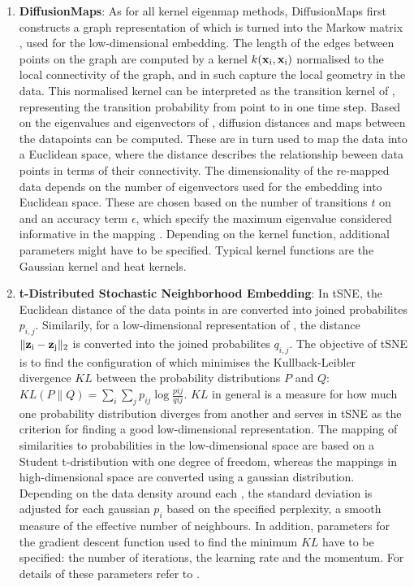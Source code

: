 \begin{enumerate}
\item\textbf{DiffusionMaps}: As for all kernel eigenmap methods, DiffusionMaps first constructs a graph representation of  which is turned into the Markow matrix , used for the low-dimensional embedding. The length of the edges between points on the graph are computed by a kernel \(k(\boldsymbol{\mathbf{x}}_\text{i},\boldsymbol{\mathbf{x}}_\text{i})\) normalised to the local connectivity of the graph, and in such capture the local geometry in the data. This normalised kernel can be interpreted as the transition kernel of , representing the transition probability from point  to  in one time step. Based on the eigenvalues and eigenvectors of , diffusion distances and maps between the datapoints can be computed. These are in turn used to map the data into a Euclidean space, where the distance describes the relationship beween data points in terms of their connectivity. The dimensionality of the re-mapped data depends on the number of eigenvectors used for the embedding into Euclidean space. These are chosen based on the number of transitions \(t\) on  and an accuracy term \(\epsilon\), which specify the maximum eigenvalue considered informative in the mapping \citep{Coifman2005,Coifman2006}. Depending on the kernel function, additional parameters might have to be specified. Typical kernel functions are the Gaussian kernel and  heat kernels.

\item\textbf{t-Distributed Stochastic Neighborhood Embedding}: In tSNE, the Euclidean distance of the data points in  are converted into joined probabilites \(p_{i,j}\). Similarily, for  a low-dimensional representation  of , the distance  \(\lVert \boldsymbol{\mathbf{z}}_\text{i} -\boldsymbol{\mathbf{z}}_\text{j}\rVert_2 \) is converted into the joined probabilites \(q_{i,j}\). The objective of tSNE is to find the configuration of  which minimises the Kullback-Leibler divergence \(KL\) between the probability distributions \(P\) and \(Q\): \(KL(P\lVert Q) = \sum_i \sum_j p_{ij}\log\frac{pij}{qij}\). \(KL\) in general is a measure for how much one probability distribution diverges from another \citep{Kullback1951} and serves in tSNE as the criterion for finding a good low-dimensional representation. The mapping of similarities to probabilities in the low-dimensional space are based on a Student t-dristibution with one degree of freedom, whereas the mappings in high-dimensional space are converted using a gaussian distribution. Depending on the data density around each , the standard deviation is adjusted for each gaussian \(p_i\) based on the specified perplexity, a smooth measure of the effective number of neighbours. In addition, parameters for the gradient descent function used to find the minimum \(KL\) have to be specified:  the number of iterations, the learning rate and the momentum. For details of these parameters refer to \citep{Maaten2008}.
\end{enumerate}

